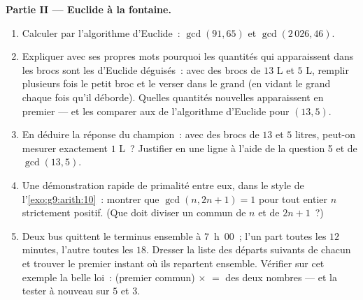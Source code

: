 \begin{problem}
\medskip
\noindent\textbf{Partie II --- Euclide à la fontaine.}
\begin{enumerate}[resume]
  \item Calculer par l'algorithme d'Euclide~: $\gcd(91, 65)$ et
        $\gcd(2\,026, 46)$.
  \item Expliquer avec ses propres mots pourquoi les quantités qui
        apparaissent dans les brocs sont les  d'Euclide
        déguisés~: avec des brocs de $13$ L et $5$ L, remplir
        plusieurs fois le petit broc et le verser dans le grand (en
        vidant le grand chaque fois qu'il déborde). Quelles
        quantités nouvelles apparaissent en premier --- et les
        comparer aux  de l'algorithme d'Euclide pour
        $(13, 5)$.
  \item En déduire la réponse du champion~: avec des brocs de $13$
        et $5$ litres, peut-on mesurer exactement $1$ L~? Justifier
        en une ligne à l'aide de la question 5 et de $\gcd(13, 5)$.
  \item Une démonstration rapide de primalité entre eux, dans le
        style de l'\cref{exo:g9:arith:10}~: montrer que
        $\gcd(n, 2n + 1) = 1$ pour tout entier $n$ strictement
        positif. (Que doit diviser un  commun de $n$ et de
        $2n + 1$~?)
  \item Deux bus quittent le terminus ensemble à 7~h~00~; l'un part
        toutes les $12$ minutes, l'autre toutes les $18$. Dresser la
        liste des départs suivants de chacun et trouver le premier
        instant où ils repartent ensemble. Vérifier sur cet exemple
        la belle loi~: (premier  commun) $\times$  $=$
         des deux nombres --- et la tester à nouveau sur $5$
        et $3$.
\end{enumerate}


\end{problem}
